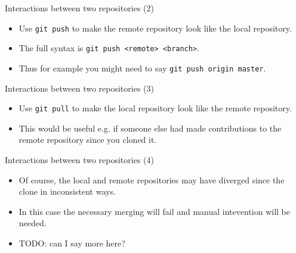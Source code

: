 \documentclass[usenames,dvipsnames]{beamer}
\newcommand{\code}[1]{\colorbox{light-gray}{\texttt{#1}}}
\begin{document}
\begin{frame}{Interactions between two repositories (2)}
  \begin{block}{}
    \begin{itemize}
      \item{Use \code{git push} to make the remote repository look like the local repository.}
      \item{The full syntax is \code{git push <remote> <branch>}.}
      \item{Thus for example you might need to say \code{git push origin master}.}
    \end{itemize}
  \end{block}
\end{frame}

\begin{frame}{Interactions between two repositories (3)}
  \begin{block}{}
    \begin{itemize}
      \item{Use \code{git pull} to make the local repository look like the remote repository.}
      \item{This would be useful e.g. if someone else had made contributions to the remote repository since you cloned it.}
    \end{itemize}
  \end{block}
\end{frame}

\begin{frame}{Interactions between two repositories (4)}
  \begin{block}{}
    \begin{itemize}
      \item{Of course, the local and remote repositories may have diverged since the clone in inconsistent ways.}
      \item{In this case the necessary merging will fail and manual intevention will be needed.}
      \item{TODO: can I say more here?}
    \end{itemize}
  \end{block}
\end{frame}
\end{document}
